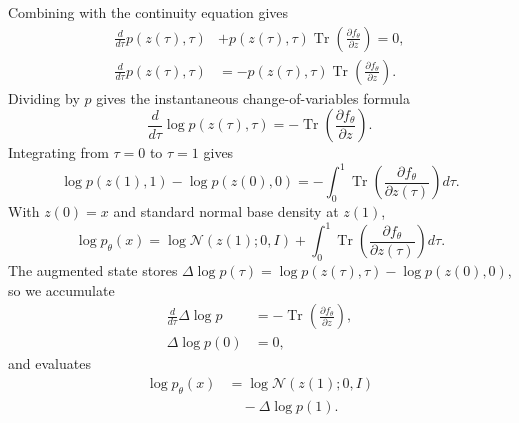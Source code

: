 \documentclass[reprint,amsmath,amssymb,aps,pra,10pt]{revtex4-2}
\begin{document}
Combining with the continuity equation gives
\begin{equation}
    \begin{aligned}
        \frac{d}{d\tau}p(z(\tau),\tau)
        &+
        p(z(\tau),\tau)
        \operatorname{Tr}
        \left(
            \frac{\partial f_\theta}{\partial z}
        \right)
        =
        0,
        \\
        \frac{d}{d\tau}p(z(\tau),\tau)
        &=
        -
        p(z(\tau),\tau)
        \operatorname{Tr}
        \left(
            \frac{\partial f_\theta}{\partial z}
        \right).
    \end{aligned}
\end{equation}
Dividing by $p$ gives the instantaneous change-of-variables formula
\begin{equation}
    \frac{d}{d\tau}\log p(z(\tau),\tau)
    =
    -
    \operatorname{Tr}
    \left(
        \frac{\partial f_\theta}{\partial z}
    \right).
\end{equation}
Integrating from $\tau=0$ to $\tau=1$ gives
\begin{equation}
    \log p(z(1),1)
    -
    \log p(z(0),0)
    =
    -
    \int_0^1
    \operatorname{Tr}
    \left(
        \frac{\partial f_\theta}{\partial z(\tau)}
    \right)
    d\tau.
\end{equation}
With $z(0)=x$ and standard normal base density at $z(1)$,
\begin{equation}
    \log p_\theta(x)
    =
    \log \mathcal{N}(z(1);0,I)
    +
    \int_0^1
    \operatorname{Tr}
    \left(
        \frac{\partial f_\theta}{\partial z(\tau)}
    \right)
    d\tau.
\end{equation}
The augmented state stores $\Delta\log p(\tau)=\log p(z(\tau),\tau)-\log p(z(0),0)$, so we accumulate
\begin{equation}
    \begin{aligned}
        \frac{d}{d\tau}\Delta\log p
        &=
        -
        \operatorname{Tr}
        \left(
            \frac{\partial f_\theta}{\partial z}
        \right),
        \\
        \Delta\log p(0)
        &=
        0,
    \end{aligned}
\end{equation}
and evaluates
\begin{equation}
    \begin{aligned}
        \log p_\theta(x)
        &=
        \log
        \mathcal{N}(z(1);0,I)
        \\
        &\quad
        -
        \Delta\log p(1).
    \end{aligned}
\end{equation}
\end{document}
